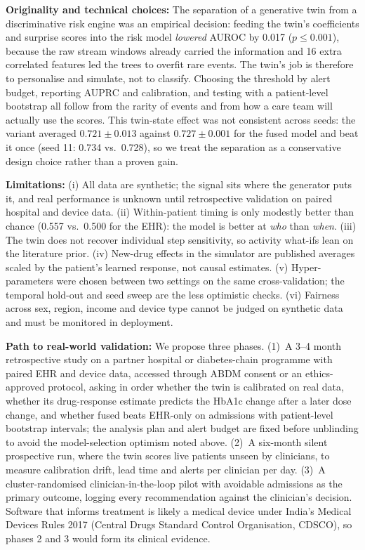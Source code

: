 \documentclass[conference]{IEEEtran}
\begin{document}
\textbf{Originality and technical choices:} The separation of a generative twin from a discriminative risk engine was an empirical decision: feeding the twin's coefficients and surprise scores into the risk model \emph{lowered} AUROC by 0.017 ($p\le0.001$), because the raw stream windows already carried the information and 16 extra correlated features led the trees to overfit rare events. The twin's job is therefore to personalise and simulate, not to classify. Choosing the threshold by alert budget, reporting AUPRC and calibration, and testing with a patient-level bootstrap all follow from the rarity of events and from how a care team will actually use the scores. This twin-state effect was not consistent across seeds: the variant averaged $0.721\pm0.013$ against $0.727\pm0.001$ for the fused model and beat it once (seed 11: 0.734 vs.\ 0.728), so we treat the separation as a conservative design choice rather than a proven gain.

\textbf{Limitations:} (i) All data are synthetic; the signal sits where the generator puts it, and real performance is unknown until retrospective validation on paired hospital and device data. (ii) Within-patient timing is only modestly better than chance (0.557 vs.\ 0.500 for the EHR): the model is better at \emph{who} than \emph{when}. (iii) The twin does not recover individual step sensitivity, so activity what-ifs lean on the literature prior. (iv) New-drug effects in the simulator are published averages scaled by the patient's learned response, not causal estimates. (v) Hyper-parameters were chosen between two settings on the same cross-validation; the temporal hold-out and seed sweep are the less optimistic checks. (vi) Fairness across sex, region, income and device type cannot be judged on synthetic data and must be monitored in deployment.

\textbf{Path to real-world validation:} We propose three phases. (1)~A 3--4 month retrospective study on a partner hospital or diabetes-chain programme with paired EHR and device data, accessed through ABDM consent or an ethics-approved protocol, asking in order whether the twin is calibrated on real data, whether its drug-response estimate predicts the HbA1c change after a later dose change, and whether fused beats EHR-only on admissions with patient-level bootstrap intervals; the analysis plan and alert budget are fixed before unblinding to avoid the model-selection optimism noted above. (2)~A six-month silent prospective run, where the twin scores live patients unseen by clinicians, to measure calibration drift, lead time and alerts per clinician per day. (3)~A cluster-randomised clinician-in-the-loop pilot with avoidable admissions as the primary outcome, logging every recommendation against the clinician's decision. Software that informs treatment is likely a medical device under India's Medical Devices Rules 2017 (Central Drugs Standard Control Organisation, CDSCO), so phases 2 and 3 would form its clinical evidence.
\end{document}
